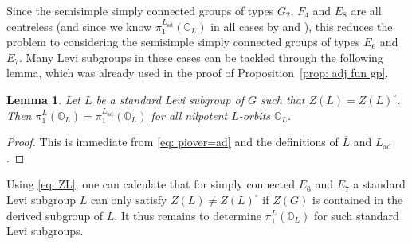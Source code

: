 \documentclass[11pt]{amsart}
\renewcommand{\O}{{\mathbb O}}
\newcommand{\ad}{{\operatorname{ad}}}
\newtheorem{lemma}[theorem]{Lemma}
\numberwithin{equation}{section}
\begin{document}
	Since the semisimple simply connected groups of types $G_2$, $F_4$ and $E_8$ are all centreless (and since we know $\pi_1^{L_\ad}(\O_L)$ in all cases by \cite[Corollary 6.1.6]{CM} and \cite[\S 8.4]{CM}), this reduces the problem to considering the semisimple simply connected groups of types $E_6$ and $E_7$. Many Levi subgroups in these cases can be  tackled through the following lemma, which was already used in the proof of Proposition~\ref{prop: adj fun gp}.
	
	\begin{lemma}\label{cor: piL=ad}
		Let $L$ be a standard Levi subgroup of $G$ such that $Z(L)=Z(L)^\circ$. Then $\pi_1^L(\O_L)=\pi_1^{L_\ad}(\O_L)$ for all nilpotent $L$-orbits $\O_L$.
	\end{lemma}
	
	\begin{proof}
		This is immediate from \eqref{eq: piover=ad} and the definitions of $\overline{L}$ and $L_\ad$.
	\end{proof}
	
	Using \eqref{eq: ZL}, one can calculate that for simply connected $E_6$ and $E_7$ a standard Levi subgroup $L$ can only satisfy $Z(L)\neq Z(L)^\circ$ if $Z(G)$ is contained in the derived subgroup of $L$. It thus remains to determine $\pi_1^L(\O_L)$ for such standard Levi subgroups.
	
\end{document}
